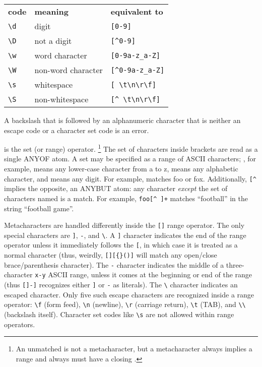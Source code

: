 \begin{center}
\begin{tabular}{lll} 
\textbf{code} & \textbf{meaning}    & \textbf{equivalent to} \\
 \verb+\d+    & digit               & \verb+[0-9]+ \\
 \verb+\D+    & not a digit         & \verb+[^0-9]+ \\
 \verb+\w+    & word character      & \verb+[0-9a-z_a-Z]+ \\
 \verb+\W+    & non-word character  & \verb+[^0-9a-z_a-Z]+ \\
 \verb+\s+    & whitespace          & \verb+[ \t\n\r\f]+ \\
 \verb+\S+    & non-whitespace      & \verb+[^ \t\n\r\f]+ \\
\end{tabular}
\end{center}

A backslash that is followed by an alphanumeric character that is neither
an escape code or a character set code is an error.

\ccode{[} is the set (or range) operator. \footnote{An unmatched
\ccode{]} is not a metacharacter, but a \ccode{[} metacharacter always
implies a range and always must have a closing \ccode{]}.} The set of
characters inside brackets \ccode{[]} are read as a single ANYOF
atom. A set may be specified as a range of ASCII characters;
\ccode{[a-z]}, for example, means any lower-case character from a to
z, \ccode{[a-zA-Z]} means any alphabetic character, and \ccode{[0-9]}
means any digit. For example,  matches foo or
fox. Additionally, \verb+[^+ implies the opposite, an ANYBUT atom: any
character \emph{except} the set of characters named is a match. For
example, \verb'foo[^ ]+' matches ``football'' in the string ``football
game''. 

Metacharacters are handled differently inside the \verb+[]+ range
operator. The only special characters are \verb+]+, \verb+-+, and
\verb+\+. A \verb+]+ character indicates the end of the range operator
unless it immediately follows the \verb+[+, in which case it is
treated as a normal character (thus, weirdly, \verb+[][{}()]+ will
match any open/close brace/parenthesis character). The \verb+-+
character indicates the middle of a three-character \verb+x-y+ ASCII
range, unless it comes at the beginning or end of the range (thus
\verb+[]-]+ recognizes either \verb+]+ or \verb+-+ as literals).  The
\verb+\+ character indicates an escaped character. Only five such
escape characters are recognized inside a range operator: \verb+\f+
(form feed), \verb+\n+ (newline), \verb+\r+ (carriage return),
\verb+\t+ (TAB), and \verb+\\+ (backslash itself). Character set codes
like \verb+\s+ are not allowed within range operators.








